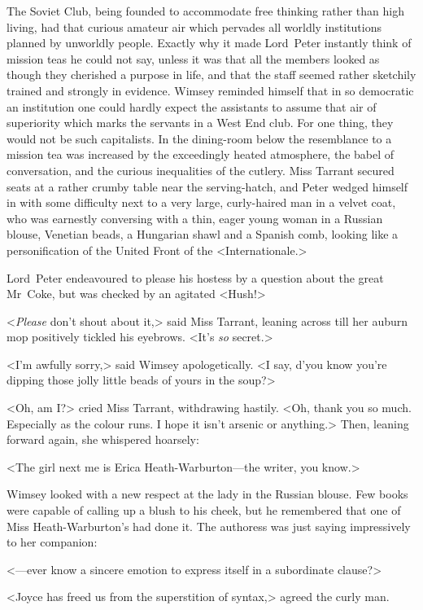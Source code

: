 The Soviet Club, being founded to accommodate free thinking rather than high living, had that curious amateur air which pervades all worldly institutions planned by unworldly people. Exactly why it made Lord~Peter instantly think of mission teas he could not say, unless it was that all the members looked as though they cherished a purpose in life, and that the staff seemed rather sketchily trained and strongly in evidence. Wimsey reminded himself that in so democratic an institution one could hardly expect the assistants to assume that air of superiority which marks the servants in a West End club. For one thing, they would not be such capitalists. In the dining-room below the resemblance to a mission tea was increased by the exceedingly heated atmosphere, the babel of conversation, and the curious inequalities of the cutlery. Miss Tarrant secured seats at a rather crumby table near the serving-hatch, and Peter wedged himself in with some difficulty next to a very large, curly-haired man in a velvet coat, who was earnestly conversing with a thin, eager young woman in a Russian blouse, Venetian beads, a Hungarian shawl and a Spanish comb, looking like a personification of the United Front of the <Internationale.>

Lord~Peter endeavoured to please his hostess by a question about the great Mr~Coke, but was checked by an agitated <Hush!>

<\emph{Please} don't shout about it,> said Miss Tarrant, leaning across till her auburn mop positively tickled his eyebrows. <It's \emph{so} secret.>

<I'm awfully sorry,> said Wimsey apologetically. <I say, d'you know you're dipping those jolly little beads of yours in the soup?>

<Oh, am I\@?> cried Miss Tarrant, withdrawing hastily. <Oh, thank you so much. Especially as the colour runs. I hope it isn't arsenic or anything.> Then, leaning forward again, she whispered hoarsely:

<The girl next me is Erica Heath-Warburton—the writer, you know.>

Wimsey looked with a new respect at the lady in the Russian blouse.  Few books were capable of calling up a blush to his cheek, but he remembered that one of Miss Heath-Warburton's had done it. The authoress was just saying impressively to her companion:

<—ever know a sincere emotion to express itself in a subordinate clause?>

<Joyce has freed us from the superstition of syntax,> agreed the curly man.

